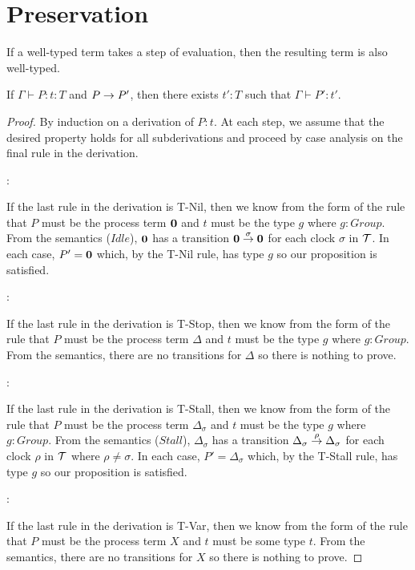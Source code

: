 \chapter{Preservation}
\label{preservation}

If a well-typed term takes a step of evaluation, then the resulting
term is also well-typed.

\begin{theorem}
If $\Gamma \vdash P : t : T$ and $P \stackrel{}{\rightarrow} P'$, then there exists
$t' : T$ such that $\Gamma \vdash P' : t'$.
\end{theorem}

\begin{proof}
By induction on a derivation of $P:t$.  At each step, we assume that
the desired property holds for all subderivations and proceed by case
analysis on the final rule in the derivation.

:

\noindent If the last rule in the derivation is T-Nil, then we know
from the form of the rule that $P$ must be the process term $\textbf{0}$ and
$t$ must be the type $g$ where $g : Group$.  From the semantics
($Idle$), $\textbf{0}$ has a transition $\textbf{0} \stackrel{\sigma}{\rightarrow} \textbf{0}$ for
each clock $\sigma$ in $\text{$\mathcal{T}$}$.  In each case, $P' = \textbf{0}$ which, by
the T-Nil rule, has type $g$ so our proposition is satisfied.

:

\noindent If the last rule in the derivation is T-Stop, then we know
from the form of the rule that $P$ must be the process term $\Delta$
and $t$ must be the type $g$ where $g : Group$.  From the semantics,
there are no transitions for $\Delta$ so there is nothing to prove.

:

\noindent If the last rule in the derivation is T-Stall, then we know
from the form of the rule that $P$ must be the process term
$\Delta_\sigma$ and $t$ must be the type $g$ where $g : Group$.  From
the semantics ($Stall$), $\Delta_\sigma$ has a transition
$\Delta_\sigma \stackrel{\rho}{\rightarrow} \Delta_\sigma$ for each clock $\rho$ in
$\text{$\mathcal{T}$}$ where $\rho \ne \sigma$.  In each case, $P' = \Delta_\sigma$
which, by the T-Stall rule, has type $g$ so our proposition is
satisfied.

:

\noindent If the last rule in the derivation is T-Var, then we know
from the form of the rule that $P$ must be the process term $X$ and
$t$ must be some type $t$.  From the semantics, there are no
transitions for $X$ so there is nothing to prove.


\end{proof}
